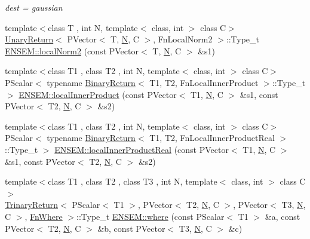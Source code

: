 \begin{DoxyCompactItemize}
\begin{DoxyCompactList}\small\item\em dest = gaussian \end{DoxyCompactList}\item 
{\footnotesize template$<$class T , int N, template$<$ class, int $>$ class C$>$ }\\\mbox{\hyperlink{structUnaryReturn}{Unary\+Return}}$<$ P\+Vector$<$ T, \mbox{\hyperlink{adat__devel_2lib_2hadron_2operator__name__util_8cc_a7722c8ecbb62d99aee7ce68b1752f337}{N}}, C $>$, Fn\+Local\+Norm2 $>$\+::Type\+\_\+t \mbox{\hyperlink{group__primvector_ga50edf2bff5393989dac9f89e511257be}{E\+N\+S\+E\+M\+::local\+Norm2}} (const P\+Vector$<$ T, \mbox{\hyperlink{adat__devel_2lib_2hadron_2operator__name__util_8cc_a7722c8ecbb62d99aee7ce68b1752f337}{N}}, C $>$ \&s1)
\item 
{\footnotesize template$<$class T1 , class T2 , int N, template$<$ class, int $>$ class C$>$ }\\P\+Scalar$<$ typename \mbox{\hyperlink{structBinaryReturn}{Binary\+Return}}$<$ T1, T2, Fn\+Local\+Inner\+Product $>$\+::Type\+\_\+t $>$ \mbox{\hyperlink{group__primvector_gabdc482461364fd471e22ddd6c0e1c2dd}{E\+N\+S\+E\+M\+::local\+Inner\+Product}} (const P\+Vector$<$ T1, \mbox{\hyperlink{adat__devel_2lib_2hadron_2operator__name__util_8cc_a7722c8ecbb62d99aee7ce68b1752f337}{N}}, C $>$ \&s1, const P\+Vector$<$ T2, \mbox{\hyperlink{adat__devel_2lib_2hadron_2operator__name__util_8cc_a7722c8ecbb62d99aee7ce68b1752f337}{N}}, C $>$ \&s2)
\item 
{\footnotesize template$<$class T1 , class T2 , int N, template$<$ class, int $>$ class C$>$ }\\P\+Scalar$<$ typename \mbox{\hyperlink{structBinaryReturn}{Binary\+Return}}$<$ T1, T2, Fn\+Local\+Inner\+Product\+Real $>$\+::Type\+\_\+t $>$ \mbox{\hyperlink{group__primvector_gad425d93792f21129cff7411c89c12d80}{E\+N\+S\+E\+M\+::local\+Inner\+Product\+Real}} (const P\+Vector$<$ T1, \mbox{\hyperlink{adat__devel_2lib_2hadron_2operator__name__util_8cc_a7722c8ecbb62d99aee7ce68b1752f337}{N}}, C $>$ \&s1, const P\+Vector$<$ T2, \mbox{\hyperlink{adat__devel_2lib_2hadron_2operator__name__util_8cc_a7722c8ecbb62d99aee7ce68b1752f337}{N}}, C $>$ \&s2)
\item 
{\footnotesize template$<$class T1 , class T2 , class T3 , int N, template$<$ class, int $>$ class C$>$ }\\\mbox{\hyperlink{structTrinaryReturn}{Trinary\+Return}}$<$ P\+Scalar$<$ T1 $>$, P\+Vector$<$ T2, \mbox{\hyperlink{adat__devel_2lib_2hadron_2operator__name__util_8cc_a7722c8ecbb62d99aee7ce68b1752f337}{N}}, C $>$, P\+Vector$<$ T3, \mbox{\hyperlink{adat__devel_2lib_2hadron_2operator__name__util_8cc_a7722c8ecbb62d99aee7ce68b1752f337}{N}}, C $>$, \mbox{\hyperlink{structFnWhere}{Fn\+Where}} $>$\+::Type\+\_\+t \mbox{\hyperlink{group__primvector_ga17c089532ed62b8ac706539d3d0ecd14}{E\+N\+S\+E\+M\+::where}} (const P\+Scalar$<$ T1 $>$ \&a, const P\+Vector$<$ T2, \mbox{\hyperlink{adat__devel_2lib_2hadron_2operator__name__util_8cc_a7722c8ecbb62d99aee7ce68b1752f337}{N}}, C $>$ \&b, const P\+Vector$<$ T3, \mbox{\hyperlink{adat__devel_2lib_2hadron_2operator__name__util_8cc_a7722c8ecbb62d99aee7ce68b1752f337}{N}}, C $>$ \&c)

\end{DoxyCompactItemize}
